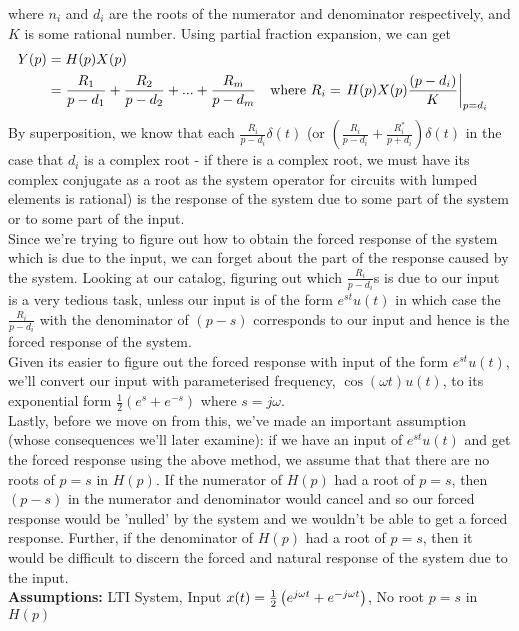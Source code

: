 \documentclass{report}
\begin{document}
where $n_i$ and $d_i$ are the roots of the numerator and denominator respectively, and $K$ is some rational number. Using partial fraction expansion, we can get
\begin{align*} 
    Y(p) &= H(p)X(p) \\ &= \frac{R_1}{p-d_1} + \frac{R_2}{p-d_2} + ... + \frac{R_m}{p-d_m} && \text{where } R_i = \eval{H(p)X(p)\frac{(p-d_i)}{K}}_{p=d_i}
\end{align*}
By superposition, we know that each $\frac{R_i}{p-d_i}\delta(t)$ (or $\left(\frac{R_i}{p-d_i} + \frac{R_i^*}{p+d_i}\right)\delta(t)$ in the case that $d_i$ is a complex root - if there is a complex root, we must have its complex conjugate as a root as the system operator for circuits with lumped elements is rational) is the response of the system due to some part of the system or to some part of the input. \smallskip \\ 
Since we're trying to figure out how to obtain the forced response of the system which is due to the input, we can forget about the part of the response caused by the system. Looking at our catalog, figuring out which $\tfrac{R_i}{p-d_i}$s is due to our input is a very tedious task, unless our input is of the form $e^{st}u(t)$ in which case the $\tfrac{R_i}{p-d_i}$ with the denominator of $(p-s)$ corresponds to our input and hence is the forced response of the system. \smallskip \\
Given its easier to figure out the forced response with input of the form $e^{st}u(t)$, we'll convert our input with parameterised frequency, $\cos(\omega t)u(t)$, to its exponential form $\tfrac{1}{2}\left(e^{s}+e^{-s}\right)$ where $s = j \omega$. \smallskip \\
Lastly, before we move on from this, we've made an important assumption (whose consequences we'll later examine): if we have an input of $e^{st}u(t)$ and get the forced response using the above method, we assume that that there are no roots of $p = s$ in $H(p)$. If the numerator of $H(p)$ had a root of $p = s$, then $(p-s)$ in the numerator and denominator would cancel and so our forced response would be 'nulled' by the system and we wouldn't be able to get a forced response. Further, if the denominator of $H(p)$ had a root of $p = s$, then it would be difficult to discern the forced and natural response of the system due to the input. \\
\textbf{Assumptions:} LTI System, Input $x(t) = \tfrac{1}{2}\left(e^{j\omega t}+e^{-j\omega t}\right)$, No root $p = s$ in $H(p)$ \smallskip\\
\end{document}
